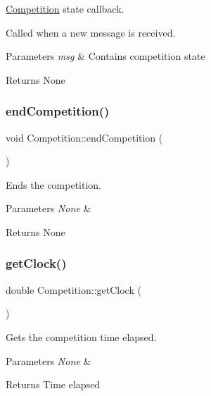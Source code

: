 \hyperlink{classCompetition}{Competition} state callback. 

Called when a new message is received.


\begin{DoxyParams}{Parameters}
{\em msg} & Contains competition state \\
\hline
\end{DoxyParams}
\begin{DoxyReturn}{Returns}
None 
\end{DoxyReturn}
\mbox{\label{classCompetition_a894a450b89f8d61d83f02f221fb1b0eb}} 
\subsubsection{\texorpdfstring{end\+Competition()}{endCompetition()}}
{\footnotesize\ttfamily void Competition\+::end\+Competition (\begin{DoxyParamCaption}{ }\end{DoxyParamCaption})}



Ends the competition. 


\begin{DoxyParams}{Parameters}
{\em None} & \\
\hline
\end{DoxyParams}
\begin{DoxyReturn}{Returns}
None 
\end{DoxyReturn}
\mbox{\label{classCompetition_a4ea6b45be32e5b0e1f8e72fc053c4550}} 
\subsubsection{\texorpdfstring{get\+Clock()}{getClock()}}
{\footnotesize\ttfamily double Competition\+::get\+Clock (\begin{DoxyParamCaption}{ }\end{DoxyParamCaption})}



Gets the competition time elapsed. 


\begin{DoxyParams}{Parameters}
{\em None} & \\
\hline
\end{DoxyParams}
\begin{DoxyReturn}{Returns}
Time elapsed 
\end{DoxyReturn}
\mbox{\label{classCompetition_a3c553faa38b1bc1fa6efa049c8e23735}} 
